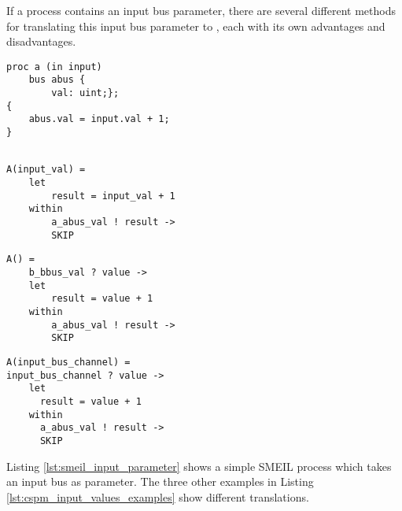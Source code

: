 If a process contains an input bus parameter, there are several different methods for translating this input bus parameter to \cspm{}, each with its own advantages and disadvantages.\\

\begin{minipage}[t]{.98\linewidth}
    \centering
\begin{minipage}[t]{0.45\linewidth}
  \begin{verbatim}
proc a (in input)
    bus abus {
        val: uint;};
{
    abus.val = input.val + 1;
}
  \end{verbatim}
  \label{lst:smeil_input_parameter}
\end{minipage}
\hspace{0.6cm}
\begin{minipage}[t]{0.45\linewidth}
\begin{verbatim}

A(input_val) =
    let
        result = input_val + 1
    within
        a_abus_val ! result ->
        SKIP
\end{verbatim}
\label{lst:cspm_input_value}
\end{minipage}
\hspace{0.6cm}
\vspace{0.5cm}
\newline
\begin{minipage}[t]{0.45\linewidth}
\begin{verbatim}
A() =
    b_bbus_val ? value ->
    let
        result = value + 1
    within
        a_abus_val ! result ->
        SKIP
\end{verbatim}
\label{lst:cspm_no_input}
\end{minipage}
\hspace{0.6cm}
\begin{minipage}[t]{0.45\linewidth}
\begin{verbatim}
A(input_bus_channel) =
input_bus_channel ? value ->
    let
      result = value + 1
    within
      a_abus_val ! result ->
      SKIP
\end{verbatim}
\label{lst:cspm_channel_reads_input}
\end{minipage}
\vspace{0.3cm}
\label{lst:cspm_input_values_examples}
\vspace{1cm}
\end{minipage}
Listing \ref{lst:smeil_input_parameter} shows a simple SMEIL process which takes an input bus as parameter. The three other examples in Listing \ref{lst:cspm_input_values_examples} show different translations.\\

